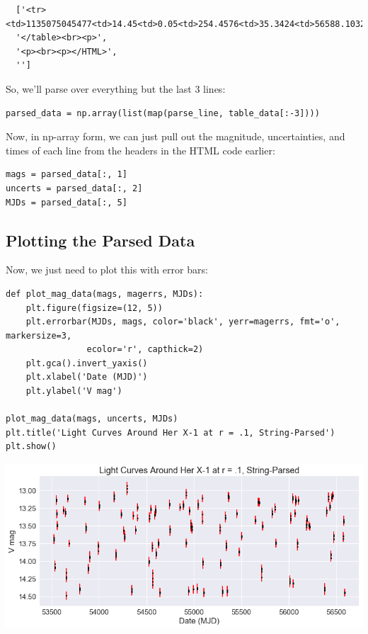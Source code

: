 \documentclass[11pt]{article}
\begin{document}
\begin{verbatim}
  ['<tr><td>1135075045477<td>14.45<td>0.05<td>254.4576<td>35.3424<td>56588.10323</tr>',
  '</table><br><p>',
  '<p><br><p></HTML>',
  '']
\end{verbatim}

So, we'll parse over everything but the last 3 lines:

\begin{verbatim}
parsed_data = np.array(list(map(parse_line, table_data[:-3])))
\end{verbatim}


Now, in np-array form, we can just pull out the magnitude, uncertainties, and
times of each line from the headers in the HTML code earlier:

\begin{verbatim}
mags = parsed_data[:, 1]
uncerts = parsed_data[:, 2]
MJDs = parsed_data[:, 5]
\end{verbatim}

\subsection*{Plotting the Parsed Data}
\label{sec-4-1}

Now, we just need to plot this with error bars:

\begin{verbatim}
def plot_mag_data(mags, magerrs, MJDs):
    plt.figure(figsize=(12, 5))
    plt.errorbar(MJDs, mags, color='black', yerr=magerrs, fmt='o', markersize=3,
                ecolor='r', capthick=2)
    plt.gca().invert_yaxis()
    plt.xlabel('Date (MJD)')
    plt.ylabel('V mag')

plot_mag_data(mags, uncerts, MJDs)
plt.title('Light Curves Around Her X-1 at r = .1, String-Parsed')
plt.show()
\end{verbatim}

\includegraphics[width=.9\linewidth]{./obipy-resources/17087KNv.png}
\end{document}
